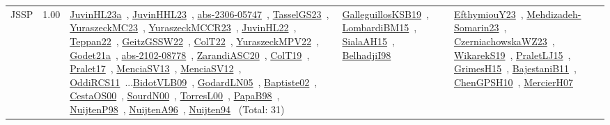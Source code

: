 {\begin{longtable}{p{3cm}r>{\raggedright\arraybackslash}p{6cm}>{\raggedright\arraybackslash}p{6cm}>{\raggedright\arraybackslash}p{8cm}}
\index{JSSP}\index{Classification!JSSP}JSSP &  1.00 & \href{../works/JuvinHL23a.pdf}{JuvinHL23a}~\cite{JuvinHL23a}, \href{../works/JuvinHHL23.pdf}{JuvinHHL23}~\cite{JuvinHHL23}, \href{../works/abs-2306-05747.pdf}{abs-2306-05747}~\cite{abs-2306-05747}, \href{../works/TasselGS23.pdf}{TasselGS23}~\cite{TasselGS23}, \href{../works/YuraszeckMC23.pdf}{YuraszeckMC23}~\cite{YuraszeckMC23}, \href{../works/YuraszeckMCCR23.pdf}{YuraszeckMCCR23}~\cite{YuraszeckMCCR23}, \href{../works/JuvinHL22.pdf}{JuvinHL22}~\cite{JuvinHL22}, \href{../works/Teppan22.pdf}{Teppan22}~\cite{Teppan22}, \href{../works/GeitzGSSW22.pdf}{GeitzGSSW22}~\cite{GeitzGSSW22}, \href{../works/ColT22.pdf}{ColT22}~\cite{ColT22}, \href{../works/YuraszeckMPV22.pdf}{YuraszeckMPV22}~\cite{YuraszeckMPV22}, \href{../works/Godet21a.pdf}{Godet21a}~\cite{Godet21a}, \href{../works/abs-2102-08778.pdf}{abs-2102-08778}~\cite{abs-2102-08778}, \href{../works/ZarandiASC20.pdf}{ZarandiASC20}~\cite{ZarandiASC20}, \href{../works/ColT19.pdf}{ColT19}~\cite{ColT19}, \href{../works/Pralet17.pdf}{Pralet17}~\cite{Pralet17}, \href{../works/MenciaSV13.pdf}{MenciaSV13}~\cite{MenciaSV13}, \href{../works/MenciaSV12.pdf}{MenciaSV12}~\cite{MenciaSV12}, \href{../works/OddiRCS11.pdf}{OddiRCS11}~\cite{OddiRCS11}...\href{../works/BidotVLB09.pdf}{BidotVLB09}~\cite{BidotVLB09}, \href{../works/GodardLN05.pdf}{GodardLN05}~\cite{GodardLN05}, \href{../works/Baptiste02.pdf}{Baptiste02}~\cite{Baptiste02}, \href{../works/CestaOS00.pdf}{CestaOS00}~\cite{CestaOS00}, \href{../works/SourdN00.pdf}{SourdN00}~\cite{SourdN00}, \href{../works/TorresL00.pdf}{TorresL00}~\cite{TorresL00}, \href{../works/PapaB98.pdf}{PapaB98}~\cite{PapaB98}, \href{../works/NuijtenP98.pdf}{NuijtenP98}~\cite{NuijtenP98}, \href{../works/NuijtenA96.pdf}{NuijtenA96}~\cite{NuijtenA96}, \href{../works/Nuijten94.pdf}{Nuijten94}~\cite{Nuijten94} (Total: 31) & \href{../works/GalleguillosKSB19.pdf}{GalleguillosKSB19}~\cite{GalleguillosKSB19}, \href{../works/LombardiBM15.pdf}{LombardiBM15}~\cite{LombardiBM15}, \href{../works/SialaAH15.pdf}{SialaAH15}~\cite{SialaAH15}, \href{../works/BelhadjiI98.pdf}{BelhadjiI98}~\cite{BelhadjiI98} & \href{../works/EfthymiouY23.pdf}{EfthymiouY23}~\cite{EfthymiouY23}, \href{../works/Mehdizadeh-Somarin23.pdf}{Mehdizadeh-Somarin23}~\cite{Mehdizadeh-Somarin23}, \href{../works/CzerniachowskaWZ23.pdf}{CzerniachowskaWZ23}~\cite{CzerniachowskaWZ23}, \href{../works/WikarekS19.pdf}{WikarekS19}~\cite{WikarekS19}, \href{../works/PraletLJ15.pdf}{PraletLJ15}~\cite{PraletLJ15}, \href{../works/GrimesH15.pdf}{GrimesH15}~\cite{GrimesH15}, \href{../works/BajestaniB11.pdf}{BajestaniB11}~\cite{BajestaniB11}, \href{../works/ChenGPSH10.pdf}{ChenGPSH10}~\cite{ChenGPSH10}, \href{../works/MercierH07.pdf}{MercierH07}~\cite{MercierH07}\\

\end{longtable}}
